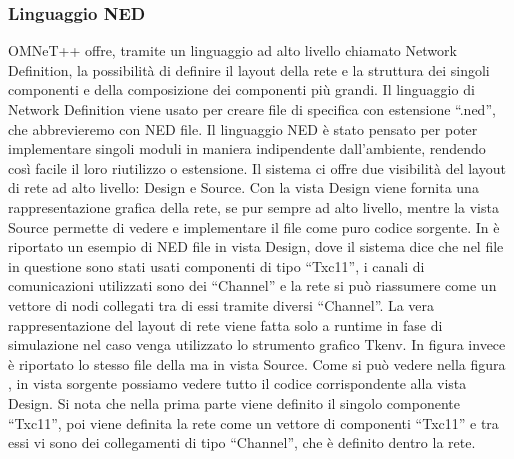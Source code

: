 \subsubsection{Linguaggio NED}
OMNeT++ offre, tramite un linguaggio ad alto livello chiamato Network Definition, la possibilità di definire il layout della rete e la struttura dei singoli componenti e della composizione dei componenti più grandi. Il linguaggio di Network Definition viene usato per creare file di specifica con estensione “.ned”, che abbrevieremo con NED file. Il linguaggio NED è stato pensato per poter implementare singoli moduli in maniera indipendente dall'ambiente, rendendo così facile il loro riutilizzo o estensione. Il sistema ci offre due visibilità del layout di rete ad alto livello: Design e Source. Con la vista Design viene fornita una rappresentazione grafica della rete, se pur sempre ad alto livello, mentre la vista Source permette di vedere e implementare il file come puro codice sorgente. In  è riportato un esempio di NED file in vista Design, dove il sistema dice che nel file in questione sono stati usati componenti di tipo “Txc11”, i canali di comunicazioni utilizzati sono dei “Channel” e la rete si può riassumere come un vettore di nodi collegati tra di essi tramite diversi “Channel”. La vera rappresentazione del layout di rete viene fatta solo a runtime in fase di simulazione nel caso venga utilizzato lo strumento grafico Tkenv. In figura  invece è riportato lo stesso file della  ma in vista Source. Come si può vedere nella figura , in vista sorgente possiamo vedere tutto il codice corrispondente alla vista Design. Si nota che nella prima parte viene definito il singolo componente “Txc11”, poi viene definita la rete come un vettore di componenti “Txc11” e tra essi vi sono dei collegamenti di tipo “Channel”, che è definito dentro la rete.
\bigskip
